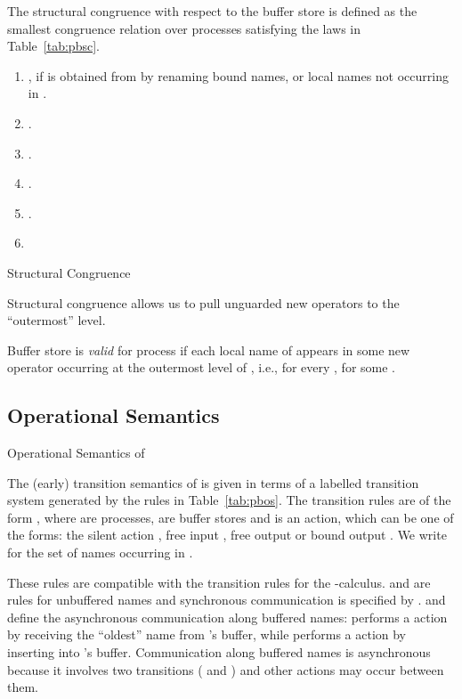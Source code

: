 \documentclass[runningheads, envcountsame, a4paper]{llncs}
\begin{document}
The structural congruence  with respect to the buffer store  is defined as the smallest congruence relation
over processes satisfying the laws in Table~\ref{tab:pbsc}.
\begin{table}
\begin{enumerate}  \setlength{\itemsep}{0ex}
  \item , if  is obtained from  by renaming bound names, or local names not occurring in .
  \item .
  \item .
  \item .
  \item .
  \item 
\end{enumerate}
\caption{Structural Congruence}
\label{tab:pbsc}
\end{table}
Structural congruence allows us to pull unguarded new operators to the ``outermost'' level.

Buffer store  is \emph{valid} for process  if each local name of  appears in some new operator occurring
at the outermost level of , i.e., for every ,  for some .



\subsection{Operational Semantics}

\begin{table}
  
  \caption{Operational Semantics of }
  \label{tab:pbos}
\end{table}

The (early) transition semantics of  is given in terms of a labelled transition system generated
by the rules in Table~\ref{tab:pbos}.
The transition rules are of the form , where  are processes,  are buffer stores
and  is an action,  which can be one of the forms:
the silent action , free input , free output  or bound output .
We write  for the set of names occurring in .

These rules are compatible with the transition rules for the -calculus.
 and  are rules for unbuffered names and synchronous communication is specified by .
 and  define the asynchronous communication along buffered names:
 performs a  action by receiving the ``oldest'' name  from 's buffer,
while  performs a  action by inserting  into 's buffer.
Communication along buffered names is asynchronous because it involves two transitions ( and )
and other actions may occur between them.
\end{document}
